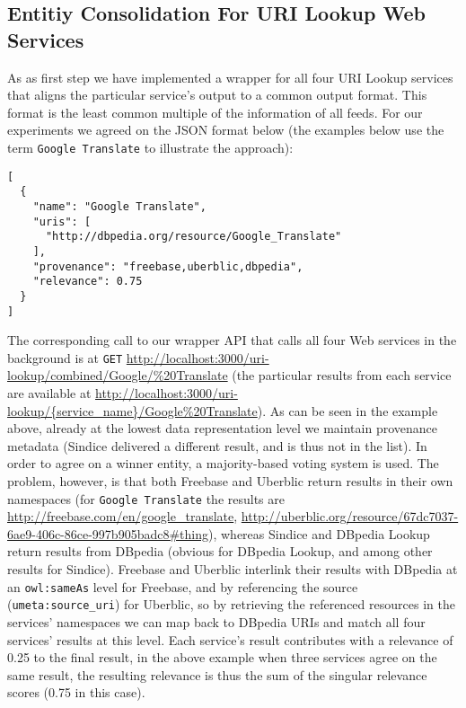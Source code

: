 \documentclass{acm_proc_article-sp}
\begin{document}
\subsection{Entitiy Consolidation For URI Lookup Web Services}\label{sec:consolidation1}
As as first step we have implemented a wrapper for all four URI Lookup services that aligns the particular service's output to a common output format. This format is the least common multiple of the information of all feeds. For our experiments we agreed on the JSON format below (the examples below use the term \texttt{Google Translate} to illustrate the approach):
\begin{verbatim}
[
  {
    "name": "Google Translate",
    "uris": [
      "http://dbpedia.org/resource/Google_Translate"
    ],
    "provenance": "freebase,uberblic,dbpedia",
    "relevance": 0.75
  }
]
\end{verbatim}
The corresponding call to our wrapper API that calls all four Web services in the background is at \texttt{GET} \url{http://localhost:3000/uri-lookup/combined/Google/%20Translate} (the particular results from each service are available at \url{http://localhost:3000/uri-lookup/{service_name}/Google%
\end{document}
